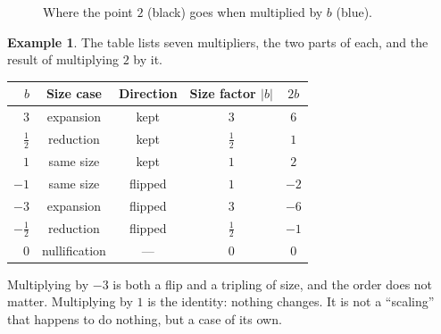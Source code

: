 \documentclass[12pt]{article}
\theoremstyle{definition}
\newtheorem{example}{Example}
\theoremstyle{remark}
\begin{document}
\begin{figure}[h]
\centering
{}
\caption{Where the point $2$ (black) goes when multiplied by $b$ (blue).}
\label{fig:numberline}
\end{figure}

\begin{example}\label{ex:seven}
The table lists seven multipliers, the two parts of each, and the result of multiplying $2$ by it.
\begin{center}
\begin{tabular}{@{}rcccc@{}}
\toprule
$b$ & Size case & Direction & Size factor $|b|$ & $2b$\\\midrule
$3$ & expansion & kept & $3$ & $6$\\
$\tfrac12$ & reduction & kept & $\tfrac12$ & $1$\\
$1$ & same size & kept & $1$ & $2$\\
$-1$ & same size & flipped & $1$ & $-2$\\
$-3$ & expansion & flipped & $3$ & $-6$\\
$-\tfrac12$ & reduction & flipped & $\tfrac12$ & $-1$\\
$0$ & nullification & --- & $0$ & $0$\\\bottomrule
\end{tabular}
\end{center}
Multiplying by $-3$ is both a flip and a tripling of size, and the order does not matter. Multiplying by $1$ is the identity: nothing changes. It is not a ``scaling'' that happens to do nothing, but a case of its own.
\end{example}

\end{document}
